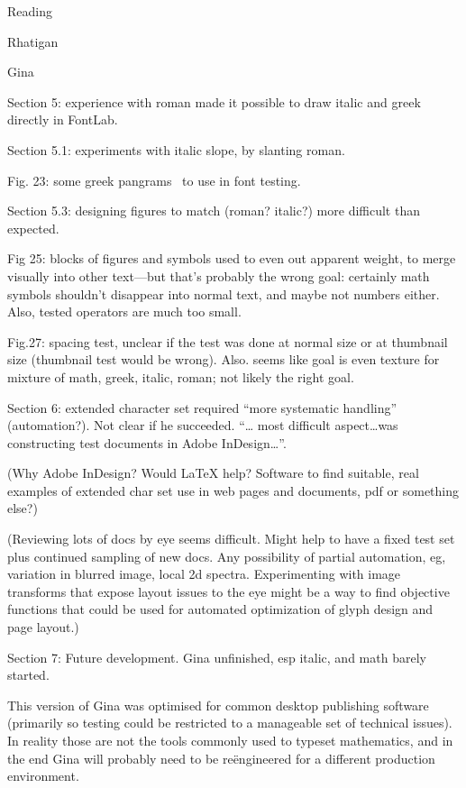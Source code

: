 \documentclass[11pt]{PalisadesLakesBook}
\begin{document}
\begin{plSection}{Reading}
\begin{plSection}{Rhatigan}
\begin{plSection}{Gina}
\begin{plSection}{}
Section 5: experience with roman made it possible
to draw italic and greek directly in FontLab.

Section 5.1: experiments with italic slope, by slanting roman.

Fig. 23: some greek pangrams~\cite{wiki:Pangram} 
to use in font testing.

Section 5.3: designing figures to match (roman? italic?)
more difficult than expected.

Fig 25: blocks of figures and symbols used to even out apparent
weight, to merge visually into other text---but that's probably
the wrong goal: certainly math symbols shouldn't disappear into
normal text, and maybe not numbers either.
Also, tested operators are much too small.

Fig.27: spacing test, unclear if the test was done at normal size
or at thumbnail size (thumbnail test would be wrong). Also. seems
like goal is even texture for mixture of math, greek, italic, 
roman; not likely the right goal.

Section 6: extended character set required 
``more systematic handling'' (automation?).
Not clear if he succeeded.
``{\ldots} most difficult aspect{\ldots}was constructing test
documents in Adobe InDesign{\ldots}''. 

(Why Adobe InDesign? 
Would {\LaTeX} help?
Software to find suitable, real examples of extended char set use 
in web pages and documents, pdf or something else?) 

(Reviewing lots of docs by eye seems difficult.
Might help to have a fixed test set plus continued sampling
of new docs.
Any possibility of partial automation, eg, variation in blurred
image, local 2d spectra.
Experimenting with image transforms that expose layout issues 
to the eye might be a way to find objective functions that
could be used for automated optimization of glyph design
and page layout.) 

Section 7: Future development. Gina unfinished, esp italic,
and math barely started.

\begin{plQuote}{}{}
This version of Gina was optimised for common desktop publishing
software (primarily so testing could be restricted to a 
manageable set of technical issues). 
In reality those are not the tools commonly used to typeset 
mathematics, and in the end Gina will probably need to be
re\"{e}ngineered for a different production environment.
\end{plQuote}
 

\end{plSection}
\end{plSection}
\end{plSection}
\end{plSection}
\end{document}
